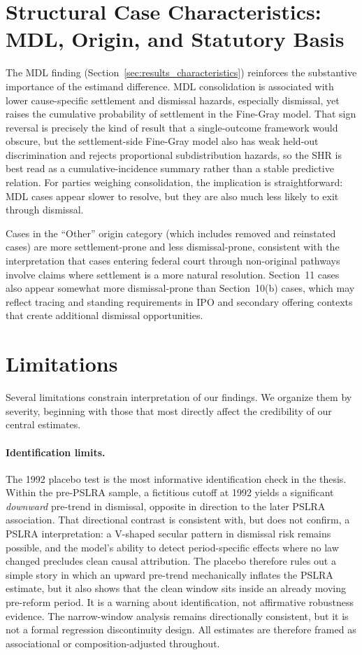 \section{Structural Case Characteristics: MDL, Origin,
and Statutory Basis}

The MDL finding (Section~\ref{sec:results_characteristics})
reinforces the substantive importance of the estimand
difference. MDL consolidation is associated with lower
cause-specific settlement and dismissal hazards, especially
dismissal, yet raises the cumulative probability of
settlement in the Fine-Gray model. That sign reversal is
precisely the kind of result that a single-outcome framework
would obscure, but the settlement-side Fine-Gray model also
has weak held-out discrimination and rejects proportional
subdistribution hazards, so the SHR is best read as a
cumulative-incidence summary rather than a stable predictive
relation. For parties weighing
consolidation, the implication is straightforward: MDL cases
appear slower to resolve, but they are also much less likely
to exit through dismissal.

Cases in the ``Other'' origin category (which includes
removed and reinstated cases) are more settlement-prone and
less dismissal-prone, consistent with the interpretation that
cases entering federal court through non-original pathways
involve claims where settlement is a more natural resolution.
Section~11 cases also appear somewhat more dismissal-prone
than Section~10(b) cases, which may reflect tracing and
standing requirements in IPO and secondary offering contexts
that create additional dismissal opportunities.

\section{Limitations}

Several limitations constrain interpretation of our
findings. We organize them by severity, beginning with
those that most directly affect the credibility of our
central estimates.

\paragraph{Identification limits.}
The 1992 placebo test is the most informative identification
check in the thesis. Within the pre-PSLRA sample, a fictitious
cutoff at 1992 yields a significant \emph{downward} pre-trend
in dismissal, opposite in direction to the later PSLRA
association. That directional contrast is consistent with,
but does not confirm, a PSLRA interpretation: a V-shaped
secular pattern in dismissal risk remains possible, and the
model's ability to detect period-specific effects where no
law changed precludes clean causal attribution. The placebo
therefore rules out a simple story in which an upward
pre-trend mechanically inflates the PSLRA estimate, but it
also shows that the clean window sits inside an already
moving pre-reform period. It is a warning about
identification, not affirmative robustness evidence. The
narrow-window analysis remains directionally consistent, but
it is not a formal regression discontinuity
design. All estimates are therefore framed as associational or
composition-adjusted throughout.

